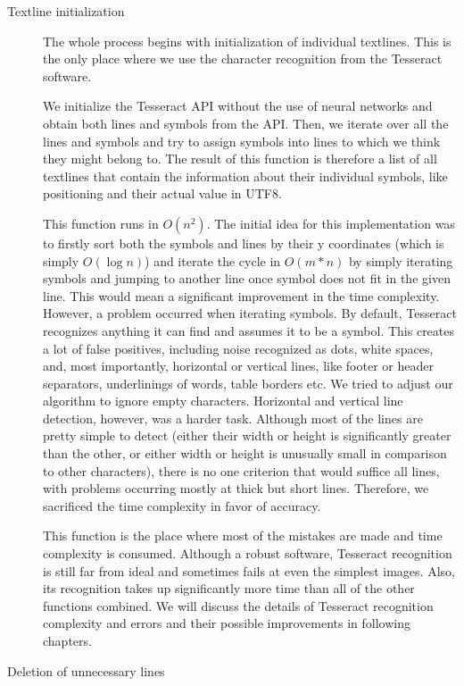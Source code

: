 \begin{description}
\item[Textline initialization] The whole process begins with initialization of individual textlines. This is the only place where we use the character recognition from the Tesseract software.

We initialize the Tesseract API without the use of neural networks and obtain both lines and symbols from the API. Then, we iterate over all the lines and symbols and try to assign symbols into lines to which we think they might belong to. The result of this function is therefore a list of all textlines that contain the information about their individual symbols, like positioning and their actual value in UTF8.

This function runs in $O(n^2)$. The initial idea for this implementation was to firstly sort both the symbols and lines by their y coordinates (which is simply $O(\log n)$) and iterate the cycle in $O(m*n)$ by simply iterating symbols and jumping to another line once symbol does not fit in the given line. This would mean a significant improvement in the time complexity. However, a problem occurred when iterating symbols. By default, Tesseract recognizes anything it can find and assumes it to be a symbol. This creates a lot of false positives, including noise recognized as dots, white spaces, and, most importantly, horizontal or vertical lines, like footer or header separators, underlinings of words, table borders etc. We tried to adjust our algorithm to ignore empty characters. Horizontal and vertical line detection, however, was a harder task. Although most of the lines are pretty simple to detect (either their width or height is significantly greater than the other, or either width or height is unusually small in comparison to other characters), there is no one criterion that would suffice all lines, with problems occurring mostly at thick but short lines. Therefore, we sacrificed  the time complexity in favor of accuracy.

This function is the place where most of the mistakes are made and time complexity is consumed. Although a robust software, Tesseract recognition is still far from ideal and sometimes fails at even the simplest images. Also, its recognition takes up significantly more time than all of the other functions combined. We will discuss the details of Tesseract recognition complexity and errors and their possible improvements in following chapters.

\item[Deletion of unnecessary lines]


\end{description}
